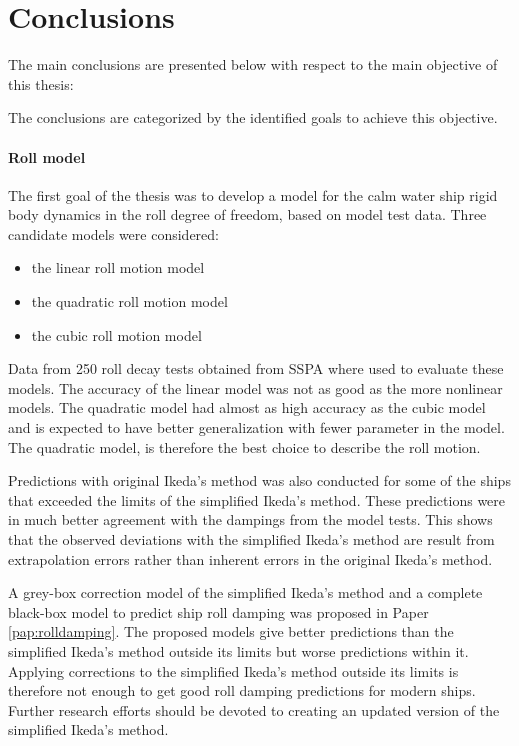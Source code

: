 \chapter{Conclusions\label{ch:conclusions}}
The main conclusions are presented below with respect to the main objective of this thesis:
\begin{quote} 
\expandafter\MakeUppercase \objective
\end{quote}
\noindent The conclusions are categorized by the identified goals to achieve this objective.

\subsubsection*{Roll model}
The first goal of the thesis was to develop a model for the calm water ship rigid body dynamics in the roll degree of freedom, based on model test data. 
Three candidate models were considered: 
\begin{itemize}
    \item the linear roll motion model
    \item the quadratic roll motion model
    \item the cubic roll motion model
\end{itemize}
\noindent Data from 250 roll decay tests obtained from SSPA where used to evaluate these models. The accuracy of the linear model was not as good as the more nonlinear models. The quadratic model had almost as high accuracy as the cubic model and is expected to have better generalization with fewer parameter in the model. The quadratic model, is therefore the best choice to describe the roll motion. 

Predictions with original Ikeda's method was also conducted for some of the ships that exceeded the limits of the simplified Ikeda's method. These predictions were in much better agreement with the dampings from the model tests. This shows that the observed deviations with the simplified Ikeda's method are result from extrapolation errors rather than inherent 
errors in the original Ikeda's method.

A grey-box correction model of the simplified Ikeda's method and a complete black-box model to predict ship roll damping was proposed in Paper \ref{pap:rolldamping}. The proposed models give better predictions than the simplified Ikeda's method outside its limits but worse predictions within it. Applying corrections to the simplified Ikeda's method outside its limits is therefore not enough to get good roll damping predictions for modern ships. Further
research efforts should be devoted to creating an updated version of the simplified Ikeda's method.

